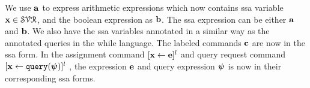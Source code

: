 \documentclass[a4paper,11pt]{article}
\begin{document}
%
%
We use ${\boldsymbol{\mathbf{a}}}$ to express arithmetic expressions which now contains ssa variable ${\boldsymbol{\mathbf{x}}} \in \mathcal{SVR}$, 
and the boolean expression as ${\boldsymbol{\mathbf{b}}}$. 
%
The ssa expression can be either ${\boldsymbol{\mathbf{a}}}$ and ${\boldsymbol{\mathbf{b}}}$. 
We also have the ssa variables annotated in a similar way as the annotated queries in the while language.
%
The labeled commands ${\boldsymbol{\mathbf{c}}}$ are now in the ssa form. 
In the assignment command $[\mathrel{ {\boldsymbol{\mathbf{x}}} \leftarrow  {\boldsymbol{\mathbf{e}}} }]^{l}$ and query request command 
$[\mathrel{ {{\boldsymbol{\mathbf{x}}}}  \leftarrow {\tt query}({{\boldsymbol{\mathbf{\psi}}}}) }]^{l}$ , 
the expression ${{\boldsymbol{\mathbf{e}}}}$ and query expression 
${\boldsymbol{\mathbf{\psi}}}$ is now in their corresponding ssa forms. 
\end{document}
